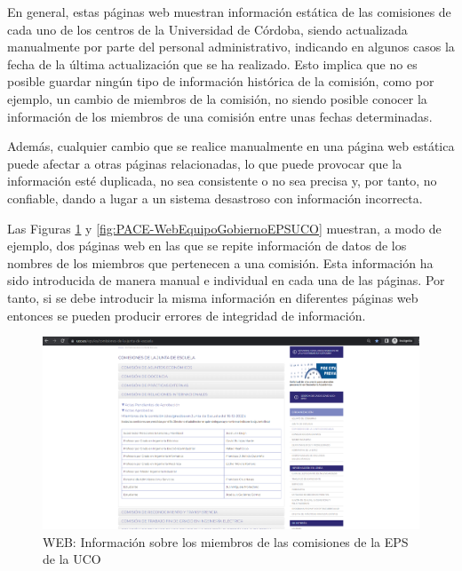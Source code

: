 En general, estas páginas web muestran información estática de las comisiones de cada uno de los centros de la Universidad de Córdoba, siendo actualizada manualmente por parte del personal administrativo, indicando en algunos casos la fecha de la última actualización que se ha realizado. Esto implica que no es posible guardar ningún tipo de información histórica de la comisión, como por ejemplo, un cambio de miembros de la comisión, no siendo posible conocer la información de los miembros de una comisión entre unas fechas determinadas. 

Además, cualquier cambio que se realice manualmente en una página web estática puede afectar a otras  páginas relacionadas, lo que puede provocar que la  información esté duplicada, no sea consistente o no sea precisa y, por tanto, no confiable, dando a lugar a un sistema desastroso con información incorrecta.


Las Figuras  \ref{fig:WebComisionesEPSUCO} y \ref{fig:PACE-WebEquipoGobiernoEPSUCO} muestran,  a modo de ejemplo, dos páginas web en las que se repite información de datos de los nombres de los miembros que pertenecen a una comisión. Esta información ha sido introducida de manera manual e individual en cada una de las páginas. Por tanto, si se debe introducir la misma información en diferentes páginas web entonces se pueden producir errores de integridad de información.

\begin{figure}[H]
    \centering
    \includegraphics[scale=0.4]{img/capturas/WebComisionesEPSUCO.png}
    \caption{WEB: Información sobre los miembros de las comisiones de la EPS de la UCO}
    \label{fig:WebComisionesEPSUCO}
\end{figure}


